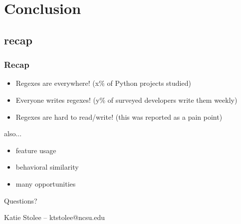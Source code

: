 \section{Conclusion}
\subsection{recap}

\begin{frame}
\frametitle{Recap}

\begin{itemize}
\item Regexes are everywhere! (x\% of Python projects studied)
\item<2-> Everyone writes regexes! (y\% of surveyed developers write them weekly)
\item<3-> Regexes are hard to read/write! (this was reported as a pain point)
\end{itemize}

also...

\begin{itemize}
\item feature usage
\item behavioral similarity
\item many opportunities
\end{itemize}


\end{frame}


\begin{frame}
\Huge{\centerline{Questions?}}
Katie Stolee -- ktstolee@ncsu.edu
\end{frame}



